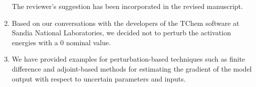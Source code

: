 \documentclass[11pt,final]{article}
\newcommand{\referee}[1]{\vspace{.1ex}\noindent{\textcolor{blue}{#1}}}
\begin{document}
\begin{enumerate}[wide, labelwidth=!, labelindent=0pt]
\noindent The reviewer's suggestion has been incorporated in the revised manuscript.

\item \referee{14.57: even if nominal is zero, one could perturb them, right? 
Or it is actually indicating the fact that there should be no exponential factor whatsoever.}

\noindent Based on our conversations with the developers of the TChem software at Sandia
National Laboratories, we decided not to perturb the activation energies with a 0
nominal value. 

\item \referee{18.35: the remark in the parentheses did not make sense to me.}

\noindent We have provided examples for perturbation-based techniques such as finite difference and
adjoint-based methods for estimating the
gradient of the model output with respect to uncertain parameters and inputs. 

\end{enumerate}
\end{document}
